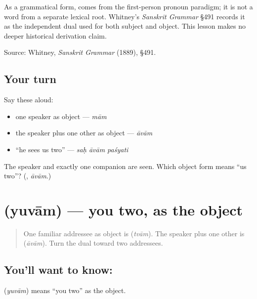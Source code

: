 \begin{cousinweb}
As a grammatical form, \textbf{} comes from the first-person pronoun paradigm; it is not a word from a separate lexical root. Whitney's \emph{Sanskrit Grammar} §491 records it as the independent dual used for both subject and object. This lesson makes no deeper historical derivation claim.

Source: Whitney, \emph{Sanskrit Grammar} (1889), §491.
\end{cousinweb}

\subsection*{Your turn}
Say these aloud:

\begin{itemize}
\raggedright
  \item one speaker as object — \emph{mām}
  \item the speaker plus one other as object — \emph{āvām}
  \item “he sees us two” — \emph{saḥ āvām paśyati}
\end{itemize}

\begin{tcolorbox}[breakable,colback=teal!4,colframe=teal!35!black,title={Before you move on}]
The speaker and exactly one companion are seen. Which object form means “us two”? (\textbf{}, \emph{āvām}.)
\end{tcolorbox}
\section[\texorpdfstring{\sk{युवाम्} (yuvām)}{युवाम् (yuvām)}]{ (yuvām) — you two, as the object}

\label{lesson:SA-C261-yuvam}



\begin{quote}
One familiar addressee as object is \textbf{} (\emph{tvām}). The speaker plus one other is \textbf{} (\emph{āvām}). Turn the dual toward two addressees.
\end{quote}

\subsection*{You'll want to know: }
\textbf{} (\emph{yuvām}) means “you two” as the object.

\begin{quote}
\textbf{  }
\end{quote}

